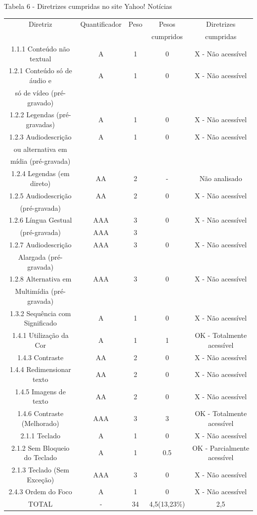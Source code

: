 \documentclass[a4paper]{article}
\begin{document}
\begin{titlepage}
Tabela 6 - Diretrizes cumpridas no site Yahoo! Notícias\\[-1cm]
\begin{center}
	\fontsize{8pt}{8pt}\selectfont	
	\begin{longtable}{|c|c|c|c|c|}
		\hline
		Diretriz & Quantificador & Peso & Pesos & Diretrizes\\
		& & & cumpridos & cumpridas\\
		\hline
		1.1.1 Conteúdo não textual & A & 1 & 0 & X - Não acessível\\
		\hline
		1.2.1 Conteúdo só de áudio e & A & 1 & 0 & X - Não acessível\\
		só de vídeo (pré-gravado) & & & & \\
		\hline
		1.2.2 Legendas (pré-gravadas) & A & 1 & 0 & X - Não acessível\\
		\hline
		1.2.3 Audiodescrição & A & 1 & 0 & X - Não acessível\\
		ou alternativa em & & & & \\
		mídia (pré-gravada) & & & & \\
		\hline
		1.2.4 Legendas (em direto) & AA & 2 & - & Não analisado \\
		\hline
		1.2.5 Audiodescrição & AA & 2 & 0 & X - Não acessível\\
		(pré-gravada) & & & & \\
		\hline
		1.2.6 Língua Gestual & AAA & 3 & 0 & X - Não acessível\\
		(pré-gravada) & AAA & 3 & & \\
		\hline
		1.2.7 Audiodescrição & AAA & 3 & 0 & X - Não acessível\\
		Alargada (pré-gravada) & & & & \\
		\hline
		1.2.8 Alternativa em & AAA & 3 & 0 & X - Não acessível\\
		Multimídia (pré-gravada) & & & & \\
		\hline
		1.3.2 Sequência com Significado & A & 1 & 0 & X - Não acessível\\
		\hline
		1.4.1 Utilização da Cor & A & 1 & 1 & OK - Totalmente acessível\\
		\hline
		1.4.3 Contraste & AA & 2 & 0 & X - Não acessível\\
		\hline
		1.4.4 Redimensionar texto & AA & 2 & 0 & X - Não acessível\\
		\hline
		1.4.5 Imagens de texto & AA & 2 & 0 & X - Não acessível \\
		\hline
		1.4.6 Contraste (Melhorado) & AAA & 3 & 3 &  OK - Totalmente acessível\\
		\hline
		2.1.1 Teclado & A & 1 & 0 &  X - Não acessível\\
		\hline
		2.1.2 Sem Bloqueio do Teclado & A & 1 & 0.5 &  OK - Parcialmente acessível\\
		\hline
		2.1.3 Teclado (Sem Exceção) & AAA & 3 & 0 & X - Não acessível\\
		\hline
		2.4.3 Ordem do Foco & A & 1 & 0 & X - Não acessível\\
		\hline
		TOTAL & - & 34 & 4,5(13,23\%) & 2,5 \\
		\hline
	\end{longtable}
\end{center}


\end{titlepage}
\end{document}
